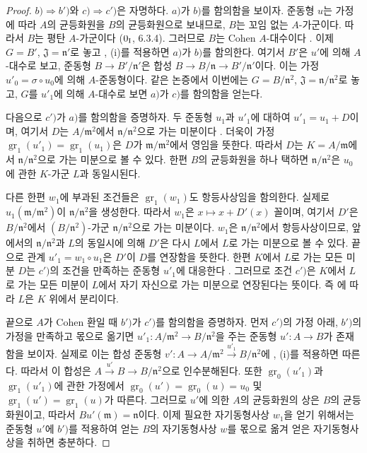 \begin{proof}
$b)\Rightarrow b')$와 $c)\Rightarrow c')$은 자명하다.
$a)$가 $b)$를 함의함을 보이자.
준동형 $u$는 가정에 따라 $A$의 균등화원을 $B$의 균등화원으로
보내므로, $B$는 꼬임 없는 $A$-가군이다. 따라서 $B$는 평탄
$A$-가군이다 ($0_{\rm I}$, 6.3.4). 그러므로 $B$는 Cohen
$A$-대수이다 . 이제 $G=B'$,
$\mathfrak J=\mathfrak n'$로 놓고 , (i)를 적용하면
$a)$가 $b)$를 함의한다. 여기서 $B'$은 $u'$에 의해 $A$-대수로
보고, 준동형 $B\to B'/\mathfrak n'$은 합성
$B\to B/\mathfrak n\to B'/\mathfrak n'$이다. 이는 가정
$u'_0=\sigma\circ u_0$에 의해 $A$-준동형이다. 같은 논증에서 이번에는
$G=B/\mathfrak n^2$, $\mathfrak J=\mathfrak n/\mathfrak n^2$로 놓고,
$G$를 $u'_1$에 의해 $A$-대수로 보면 $a)$가 $c)$를 함의함을 얻는다.

다음으로 $c')$가 $a)$를 함의함을 증명하자. 두 준동형 $u_1$과
$u'_1$에 대하여
$u'_1=u_1+D$이며, 여기서 $D$는 $A/\mathfrak m^2$에서
$\mathfrak n/\mathfrak n^2$으로 가는 미분이다
. 더욱이 가정
$\operatorname{gr}_1(u'_1)=\operatorname{gr}_1(u_1)$은 $D$가
$\mathfrak m/\mathfrak m^2$에서 영임을 뜻한다. 따라서 $D$는
$K=A/\mathfrak m$에서 $\mathfrak n/\mathfrak n^2$으로 가는 미분으로
볼 수 있다. 한편 $B$의 균등화원을 하나 택하면
$\mathfrak n/\mathfrak n^2$은 $u_0$에 관한 $K$-가군 $L$과
동일시된다.

다른 한편 $w_1$에 부과된 조건들은
$\operatorname{gr}_1(w_1)$도 항등사상임을 함의한다. 실제로
$u_1(\mathfrak m/\mathfrak m^2)$이
$\mathfrak n/\mathfrak n^2$을 생성한다. 따라서 $w_1$은
$x\mapsto x+D'(x)$ 꼴이며, 여기서 $D'$은
$B/\mathfrak n^2$에서 $(B/\mathfrak n^2)$-가군
$\mathfrak n/\mathfrak n^2$으로 가는 미분이다. $w_1$은
$\mathfrak n/\mathfrak n^2$에서 항등사상이므로, 앞에서의
$\mathfrak n/\mathfrak n^2$과 $L$의 동일시에 의해 $D'$은 다시
$L$에서 $L$로 가는 미분으로 볼 수 있다. 끝으로 관계
$u'_1=w_1\circ u_1$은 $D'$이 $D$를 연장함을 뜻한다. 한편 $K$에서
$L$로 가는 모든 미분 $D$는 $c')$의 조건을 만족하는 준동형 $u'_1$에
대응한다 . 그러므로 조건 $c')$은 $K$에서 $L$로
가는 모든 미분이 $L$에서 자기 자신으로 가는 미분으로 연장된다는
뜻이다. 즉 에 따라 $L$은 $K$ 위에서 분리이다.

끝으로 $A$가 Cohen 환일 때 $b')$가 $c')$를 함의함을 증명하자.
먼저 $c')$의 가정 아래, $b')$의 가정을 만족하고 몫으로 옮기면
$u'_1:A/\mathfrak m^2\to B/\mathfrak n^2$을 주는 준동형
$u':A\to B$가 존재함을 보이자. 실제로 이는 합성 준동형
$v':A\to A/\mathfrak m^2\xrightarrow{u'_1}B/\mathfrak n^2$에
, (i)를 적용하면 따른다.
따라서 이 합성은
$A\xrightarrow{u'}B\to B/\mathfrak n^2$으로 인수분해된다. 또한
$\operatorname{gr}_0(u'_1)$과 $\operatorname{gr}_1(u'_1)$에 관한
가정에서
$\operatorname{gr}_0(u')=\operatorname{gr}_0(u)=u_0$ 및
$\operatorname{gr}_1(u')=\operatorname{gr}_1(u)$가 따른다. 그러므로
$u'$에 의한 $A$의 균등화원의 상은 $B$의 균등화원이고, 따라서
$Bu'(\mathfrak m)=\mathfrak n$이다. 이제 필요한 자기동형사상 $w_1$을
얻기 위해서는 준동형 $u'$에 $b')$를 적용하여 얻는 $B$의
자기동형사상 $w$를 몫으로 옮겨 얻은 자기동형사상을 취하면 충분하다.
\end{proof}

